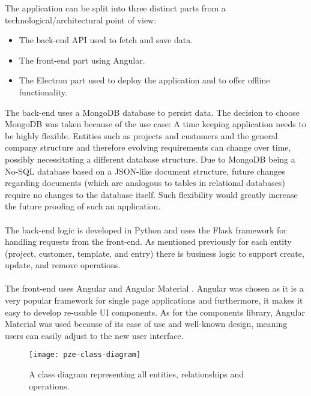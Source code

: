 
The application can be split into three distinct parts from a technological/architectural point of view:
\begin{itemize}
    \item The back-end API used to fetch and save data.
    \item The front-end part using Angular\parencite{angularDocs}.
    \item The Electron part used to deploy the application and to offer offline functionality.
  \end{itemize}
The back-end uses a MongoDB \parencite{mongoDocs} database to persist data. 
The decision to choose MongoDB was taken because of the use
case: A time keeping application needs to be highly flexible.
Entities such as projects and customers and the general company structure and therefore evolving requirements can change over time, 
possibly necessitating a different database structure. 
Due to MongoDB being a No-SQL database based on a JSON-like document structure, future changes regarding documents (which are analogous to tables 
in relational databases) require no changes to the database itself.
Such flexibility would greatly increase the future proofing of such an application.\paragraph{}
The back-end logic is developed in Python and uses the Flask framework \parencite{flaskDocs} for handling
requests from the front-end.
As mentioned previously for each entity (project, customer, template, and entry) there is business
logic to support create, update, and remove operations.\paragraph{}
The front-end uses Angular \parencite{angularDocs} and Angular Material \parencite{angularMaterialDocs}.
Angular was chosen as it is a very popular framework for single page applications and furthermore,
it makes it easy to develop re-usable UI components.
As for the components library, Angular Material was used because of its ease of use and well-known design, 
meaning users can easily adjust to the new user interface.
\begin{figure}[H]
  \centering
  \label{fig:pze-class-diagram}
  \caption{A class diagram representing all entities, relationships and operations.}
  \texttt{[image: pze-class-diagram]}
\end{figure}
